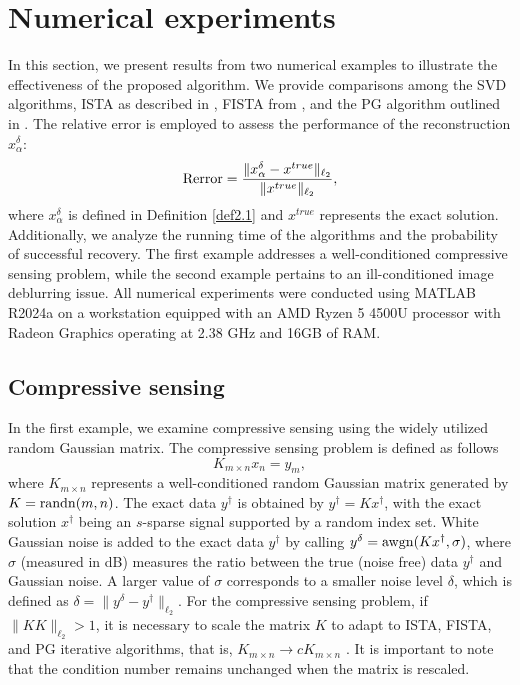 \documentclass[a4paper,12pt]{article}
\numberwithin{equation}{section}
\begin{document}
\section{Numerical experiments}\label{sec4}

In this section, we present results from two numerical examples to illustrate the effectiveness of the proposed algorithm. We provide comparisons among the SVD algorithms, ISTA as described in \cite{DFL08}, FISTA from \cite{BT09}, and the PG algorithm outlined in \cite{DH20}. The relative error is employed to assess the performance of the reconstruction $x_{\alpha}^{\delta}$:
\begin{equation*}
    {\rm Rerror} = \frac{\|x_{\alpha}^{\delta}-x^{true}\|_{\ell_{2}}}{\|x^{true}\|_{\ell_{2}}},
\end{equation*}
where $x_{\alpha}^{\delta}$ is defined in Definition \ref{def2.1} and $x^{true}$ represents the exact solution. Additionally, we analyze the running time of the algorithms and the probability of successful recovery. The first example addresses a well-conditioned compressive sensing problem, while the second example pertains to an ill-conditioned image deblurring issue. All numerical experiments were conducted using MATLAB R2024a on a workstation equipped with an AMD Ryzen 5 4500U processor with Radeon Graphics operating at 2.38 GHz and 16GB of RAM.

\subsection{Compressive sensing}\label{sec4.1}

In the first example, we examine compressive sensing using the widely utilized random Gaussian matrix. The compressive sensing problem is defined as follows
\begin{equation*}
    K_{m \times n}x_{n}=y_{m},
\end{equation*}
where $K_{m \times n}$ represents a well-conditioned random Gaussian matrix generated by $K={\rm randn}(m,n)$. The exact data $y^{\dag}$ is obtained by $y^{\dag}=Kx^{\dag}$, with the exact solution $x^{\dag}$ being an $s$-sparse signal supported by a random index set. White Gaussian noise is added to the exact data $y^{\dag}$ by calling $y^{\delta}={\rm awgn}(Kx^{\dag},\sigma)$, where $\sigma$ (measured in dB) measures the ratio between the true (noise free) data $y^{\dag}$ and Gaussian noise. A larger value of $\sigma$ corresponds to a smaller noise level $\delta$, which is defined as $\delta=\|y^{\delta}-y^{\dag}\|_{\ell_{2}}$. For the compressive sensing problem, if $\|KK\|_{\ell_{2}} > 1$, it is necessary to scale the matrix $K$ to adapt to ISTA, FISTA, and PG iterative algorithms, that is, $K_{m\times n}\rightarrow cK_{m\times n}$ \cite{DDD04}. It is important to note that the condition number remains unchanged when the matrix is rescaled.
\end{document}
